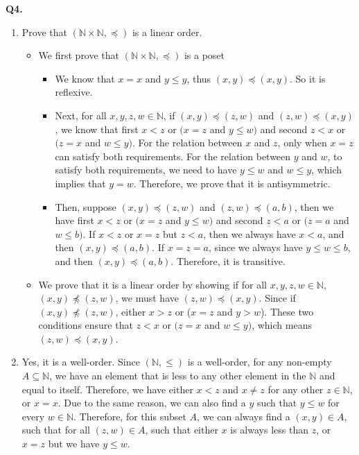 \documentclass{article}[12pt]
\begin{document}
\noindent \textbf{Q4.}
\begin{enumerate}
\item Prove that $(\mathbb{N} \times \mathbb{N}, \preceq)$ is a linear order.
\begin{itemize}
\item We first prove that $(\mathbb{N} \times \mathbb{N}, \preceq)$ is a poset
\begin{itemize}
\item We know that $x=x$ and $y\leq y$, thus $(x, y) \preceq(x, y)$. So it is reflexive.
\item Next, for all $x,y,z,w\in \mathbb{N}$, if $(x, y) \preceq(z, w)$ and $(z, w) \preceq(x, y)$, we know that first $x<z$ or $(x=z$ and $y \leq w)$ and second $z<x$ or $(z=x$ and $w \leq y)$. For the relation between $x$ and $z$, only when $x=z$ can satisfy both requirements. For the relation between $y$ and $w$, to satisfy both requirements, we need to have $y\leq w$ and $w\leq y$, which implies that $y=w$. Therefore, we prove that it is antisymmetric.
\item Then, suppose $(x, y) \preceq(z, w)$ and $(z, w) \preceq(a, b)$, then we have first $x<z$ or $(x=z$ and $y \leq w)$ and second $z<a$ or $(z=a$ and $w \leq b)$. If $x<z$ or $x=z$ but $z<a$, then we always have $x<a$, and then $(x, y) \preceq(a, b)$. If $x=z=a$, since we always have $y\leq w\leq b$, and then $(x, y) \preceq(a, b)$. Therefore, it is transitive.
\end{itemize}  
\item We prove that it is a linear order by showing if for all $x,y,z,w\in \mathbb{N}$, $(x, y) \not\preceq(z, w)$, we must have $(z, w) \preceq(x, y)$. Since if $(x, y) \not\preceq(z, w)$, either $x>z$ or ($x=z$ and $y>w$). These two conditions ensure that $z<x $ or $(z=x$ and $w \leq y)$, which means $(z, w) \preceq(x, y)$.
\end{itemize}
\item Yes, it is a well-order. Since $(\mathbb{N}, \leq)$ is a well-order, for any non-empty $A\subseteq \mathbb{N}$, we have an element that is less to any other element in the $\mathbb{N}$ and equal to itself. Therefore, we have either $x<z$ and $x\not=z$ for any other $z\in \mathbb{N}$, or $x=x$.
Due to the same reason, we can also find a $y$ such that $y\leq w$ for every $w\in \mathbb{N}$.
Therefore, for this subset $A$, we can always find a $(x,y)\in A$, such that for all $(z,w)\in A$, such that either $x$ is always less than $z$, or $x=z$ but we have $y\leq w$.
\end{enumerate}
\end{document}
